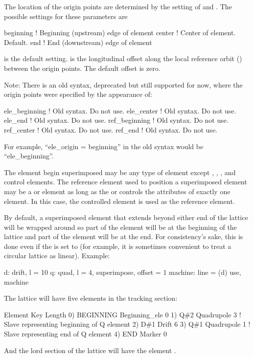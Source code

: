 The location of the origin points are determined by the setting of  and
.  The possible settings for these parameters are
\begin{example}
  beginning       ! Beginning (upstream) edge of element
  center          ! Center of element. Default.
  end             ! End (downstream) edge of element
\end{example}
 is the default setting.  is the longitudinal offset along the local reference
orbit () between the origin points. The default offset is zero.

Note: There is an old syntax, deprecated but still supported for now, where the origin points were
specified by the appearance of:
\begin{example}
  ele_beginning         ! Old syntax. Do not use.
  ele_center            ! Old syntax. Do not use.
  ele_end               ! Old syntax. Do not use.
  ref_beginning         ! Old syntax. Do not use.
  ref_center            ! Old syntax. Do not use.
  ref_end               ! Old syntax. Do not use.
\end{example}
For example, ``ele_origin = beginning'' in the old syntax would be ``ele_beginning''.

The element begin superimposed may be any type of element except , ,
, and  control elements. The reference element used to position a
superimposed element may be a  or  element as long as the  or
 controls the attributes of exactly one element. In this case, the controlled element is
used as the reference element.

By default, a superimposed element that extends beyond either end of the lattice will be wrapped
around so part of the element will be at the beginning of the lattice and part of the element will
be at the end. For consistency's sake, this is done even if the  is set to 
(for example, it is sometimes convenient to treat a circular lattice as linear). Example:
\begin{example}
  d: drift, l = 10
  q: quad, l = 4, superimpose, offset = 1
  machine: line = (d)
  use, machine
\end{example}
The lattice will have five elements in the tracking section:
\begin{example}
        Element    Key             Length
  0)    BEGINNING  Beginning_ele   0
  1)    Q{\#}2        Quadrupole      3   ! Slave representing beginning of Q element
  2)    D{\#}1        Drift           6
  3)    Q{\#}1        Quadrupole      1   ! Slave representing end of Q element
  4)    END        Marker          0
\end{example}
And the lord section of the lattice will have the element . 

